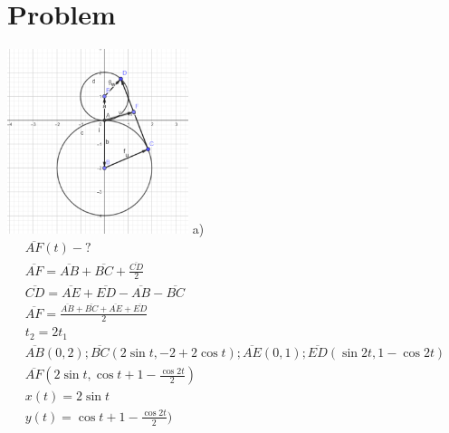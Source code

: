 \documentclass[11pt]{article}
\begin{document}
    \section{Problem}
    \includegraphics[width=200px]{coord3.PNG} \newline
    a) \newline
    \begin{gather*}
        \overline{AF}(t)-?\\
        \overline{AF}=\overline{AB}+\overline{BC}+\frac{\overline{CD}}{2}\\
        \overline{CD}=\overline{AE}+\overline{ED}-\overline{AB}-\overline{BC}\\
        \overline{AF}=\frac{\overline{AB}+\overline{BC}+\overline{AE}+\overline{ED}}{2}\\
        t_2=2t_1 \\
        \overline{AB}(0,2); \overline{BC}(2\sin{t}, -2+2\cos{t}); \overline{AE}(0, 1); \overline{ED}(\sin{2t}, 1-\cos{2t})\\
        \overline{AF}(2\sin{t}, \cos{t}+1-\frac{\cos{2t}}{2})\\
        x(t)=2\sin{t}\\
        y(t)=\cos{t}+1-\frac{\cos{2t}}{2})\\
    \end{gather*}
\end{document}
